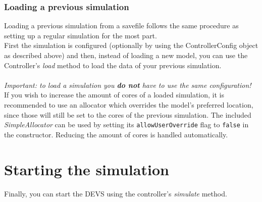 \subsubsection{Loading a previous simulation}
Loading a previous simulation from a savefile follows the same procedure as setting up a regular simulation for the most part.\\
First the simulation is configured (optionally by using the ControllerConfig object as described above) and then, instead of loading a new model, you can use the Controller's \textsl{load} method to load the data of your previous simulation.\\
\\
\textit{Important: to load a simulation you \textbf{do not} have to use the same configuration!}
\\
If you wish to increase the amount of cores of a loaded simulation, it is recommended to use an allocator which overrides the model's preferred location, since those will still be set to the cores of the previous simulation. The included \textsl{SimpleAllocator} can be used by setting its \texttt{allowUserOverride} flag to \texttt{false} in the constructor. Reducing the amount of cores is handled automatically.

\section{Starting the simulation}
Finally, you can start the DEVS using the controller's \textsl{simulate} method.
